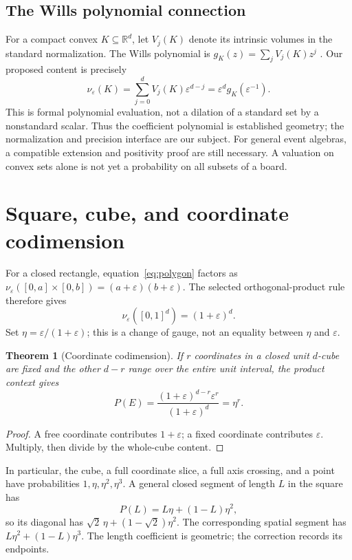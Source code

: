 \documentclass[11pt]{article}
\newtheorem{theorem}{Theorem}[section]
\theoremstyle{definition}
\theoremstyle{remark}
\newcommand{\R}{\mathbb R}
\newcommand{\eps}{\varepsilon}
\newcommand{\nuE}{\nu_{\eps}}
\begin{document}
\subsection{The Wills polynomial connection}
For a compact convex $K\subseteq\R^d$, let $V_j(K)$ denote its intrinsic
volumes in the standard normalization. The Wills polynomial is
$g_K(z)=\sum_j V_j(K)z^j$ \cite{wills}. Our proposed content is precisely
\begin{equation}\label{eq:wills}
 \nuE(K)=\sum_{j=0}^d V_j(K)\eps^{d-j}
        =\eps^d g_K(\eps^{-1}).
\end{equation}
This is formal polynomial evaluation, not a dilation of a standard set
by a nonstandard scalar. Thus the coefficient polynomial is established
geometry; the normalization and precision interface are our subject.
For general event algebras, a compatible extension and positivity proof
are still necessary. A valuation on convex sets alone is not yet a
probability on all subsets of a board.

\section{Square, cube, and coordinate codimension}
For a closed rectangle, equation~\eqref{eq:polygon} factors as
$\nuE([0,a]\times[0,b])=(a+\eps)(b+\eps)$.
The selected orthogonal-product rule therefore gives
\[
 \nuE([0,1]^d)=(1+\eps)^d.
\]
Set $\eta=\eps/(1+\eps)$; this is a change of gauge, not an equality
between $\eta$ and $\eps$.

\begin{theorem}[Coordinate codimension]
If $r$ coordinates in a closed unit $d$-cube are fixed and the other
$d-r$ range over the entire unit interval, the product context gives
\[
 P(E)=\frac{(1+\eps)^{d-r}\eps^r}{(1+\eps)^d}=\eta^r.
\]
\end{theorem}
\begin{proof}
A free coordinate contributes $1+\eps$; a fixed coordinate contributes
$\eps$. Multiply, then divide by the whole-cube content.
\end{proof}

In particular, the cube, a full coordinate slice, a full axis crossing,
and a point have probabilities $1,\eta,\eta^2,\eta^3$. A general closed
segment of length $L$ in the square has
\[
 P(L)=L\eta+(1-L)\eta^2,
\]
so its diagonal has $\sqrt2\,\eta+(1-\sqrt2)\eta^2$. The corresponding
spatial segment has $L\eta^2+(1-L)\eta^3$. The length coefficient is
geometric; the correction records its endpoints.
\end{document}
